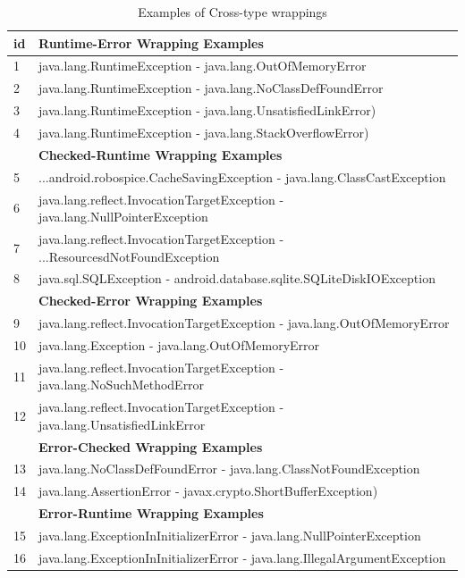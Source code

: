 \documentclass[conference]{IEEEtran}
\begin{document}
\begin{table}
\centering

\begin{tabular}{ll}
    \hline
 id & \bfseries{Runtime-Error Wrapping Examples}    \\  %
    \hline
1 & java.lang.RuntimeException - java.lang.OutOfMemoryError  \\ %
2 &java.lang.RuntimeException - java.lang.NoClassDefFoundError \\ %
3 &java.lang.RuntimeException - java.lang.UnsatisfiedLinkError)  \\ %
4& java.lang.RuntimeException -  java.lang.StackOverflowError)   \\ %
\hline
 & \bfseries{Checked-Runtime Wrapping Examples}   \\
 \hline
5& ...android.robospice.CacheSavingException - java.lang.ClassCastException   \\ %
6&java.lang.reflect.InvocationTargetException - java.lang.NullPointerException    \\ %
7&java.lang.reflect.InvocationTargetException - ...ResourcesdNotFoundException  \\ %
8&java.sql.SQLException - android.database.sqlite.SQLiteDiskIOException   \\ %
 \hline
& \bfseries{Checked-Error Wrapping Examples}  \\
 \hline
9&java.lang.reflect.InvocationTargetException - java.lang.OutOfMemoryError  \\ %
10&java.lang.Exception - java.lang.OutOfMemoryError   \\ %
11&java.lang.reflect.InvocationTargetException - java.lang.NoSuchMethodError 	 \\ %
12&java.lang.reflect.InvocationTargetException - java.lang.UnsatisfiedLinkError	 \\ %
\hline
& \bfseries{Error-Checked Wrapping Examples}  \\
 \hline
13&java.lang.NoClassDefFoundError - java.lang.ClassNotFoundException   \\ %
14&java.lang.AssertionError - javax.crypto.ShortBufferException)   \\ %
\hline
& \bfseries{Error-Runtime Wrapping Examples}    \\
 \hline
15&java.lang.ExceptionInInitializerError - java.lang.NullPointerException   \\ %
16&java.lang.ExceptionInInitializerError - java.lang.IllegalArgumentException 	 \\ %
 \hline
  \end{tabular}
\caption{Examples of Cross-type wrappings}
\label{tab:exampeswrap}
\end{table}
\end{document}
